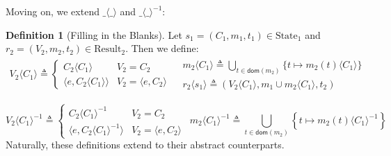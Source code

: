 \documentclass{article}
\theoremstyle{definition}
\newtheorem{definition}{Definition}[section]
\newcommand*{\mem}{m}
\newcommand*{\State}{\text{State}}
\newcommand*{\Result}{\text{Result}}
\newcommand*{\inject}[2]{{#2}\langle{#1}\rangle}
\newcommand*{\delete}[2]{{#2}{\langle{#1}\rangle}^{-1}}
\begin{document}
Moving on, we extend $\inject{\_}{\_}$ and $\delete{\_}{\_}$:
\begin{definition}[Filling in the Blanks]
  Let $s_1=(C_1,\mem_1,t_1)\in\State_1$ and $r_2=(V_2,\mem_2,t_2)\in\Result_2$. Then we define:
  \[
    \begin{array}{cc}
      \inject{C_1}{V_2}\triangleq
      \begin{cases}
        \inject{C_1}{C_2}                  & V_2=C_2                   \\
        \langle e,\inject{C_1}{C_2}\rangle & V_2=\langle e, C_2\rangle
      \end{cases} &
      \begin{array}{l}
        \inject{C_1}{\mem_2}\triangleq
        \displaystyle\bigcup_{t\in\mathsf{dom}(\mem_2)}\{t\mapsto\inject{C_1}{\mem_2(t)}\} \\
        \inject{s_1}{r_2}\triangleq
        (\inject{C_1}{V_2},\mem_1\cup\inject{C_1}{\mem_2},t_2)
      \end{array}
    \end{array}
  \]

  \[
    \delete{C_1}{V_2}\triangleq
    \begin{cases}
      \delete{C_1}{C_2}                  & V_2=C_2                   \\
      \langle e,\delete{C_1}{C_2}\rangle & V_2=\langle e, C_2\rangle
    \end{cases}\:\:
    \delete{C_1}{\mem_2}\triangleq
    \displaystyle\bigcup_{t\in\mathsf{dom}(\mem_2)}\left\{t\mapsto\delete{C_1}{\mem_2(t)}\right\}
  \]
  Naturally, these definitions extend to their abstract counterparts.
\end{definition}
\end{document}
